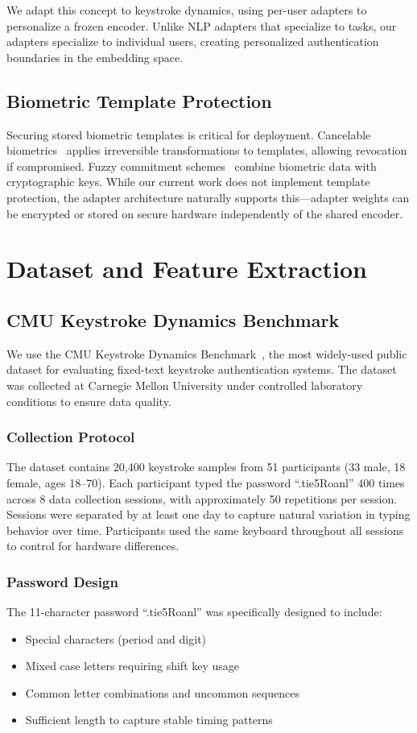 \documentclass{ieeeaccess}
\begin{document}
{We adapt this concept to keystroke dynamics, using per-user adapters to personalize a frozen encoder. Unlike NLP adapters that specialize to tasks, our adapters specialize to individual users, creating personalized authentication boundaries in the embedding space.

\subsection{Biometric Template Protection}
Securing stored biometric templates is critical for deployment. Cancelable biometrics~\cite{b30} applies irreversible transformations to templates, allowing revocation if compromised. Fuzzy commitment schemes~\cite{b31} combine biometric data with cryptographic keys. While our current work does not implement template protection, the adapter architecture naturally supports this---adapter weights can be encrypted or stored on secure hardware independently of the shared encoder.

\section{Dataset and Feature Extraction}
\label{sec:dataset}

\subsection{CMU Keystroke Dynamics Benchmark}
We use the CMU Keystroke Dynamics Benchmark~\cite{b4}, the most widely-used public dataset for evaluating fixed-text keystroke authentication systems. The dataset was collected at Carnegie Mellon University under controlled laboratory conditions to ensure data quality.

\subsubsection{Collection Protocol}
The dataset contains 20,400 keystroke samples from 51 participants (33 male, 18 female, ages 18--70). Each participant typed the password ``.tie5Roanl'' 400 times across 8 data collection sessions, with approximately 50 repetitions per session. Sessions were separated by at least one day to capture natural variation in typing behavior over time. Participants used the same keyboard throughout all sessions to control for hardware differences.

\subsubsection{Password Design}
The 11-character password ``.tie5Roanl'' was specifically designed to include:
\begin{itemize}
\item Special characters (period and digit)
\item Mixed case letters requiring shift key usage
\item Common letter combinations and uncommon sequences
\item Sufficient length to capture stable timing patterns
\end{itemize}

}
\end{document}
